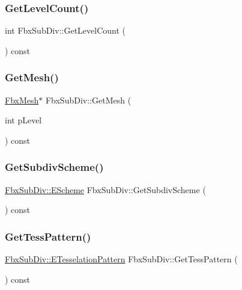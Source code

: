 \subsubsection{\texorpdfstring{Get\+Level\+Count()}{GetLevelCount()}}
{\footnotesize\ttfamily int Fbx\+Sub\+Div\+::\+Get\+Level\+Count (\begin{DoxyParamCaption}{ }\end{DoxyParamCaption}) const}

\mbox{\label{class_fbx_sub_div_a705af0c50cdd202b19bdce9c36d90f01}} 
\subsubsection{\texorpdfstring{Get\+Mesh()}{GetMesh()}}
{\footnotesize\ttfamily \hyperlink{class_fbx_mesh}{Fbx\+Mesh}$\ast$ Fbx\+Sub\+Div\+::\+Get\+Mesh (\begin{DoxyParamCaption}\item[{int}]{p\+Level }\end{DoxyParamCaption}) const}

\mbox{\label{class_fbx_sub_div_a9a0ebbb75fa4597b04a09058a4e5db0b}} 
\subsubsection{\texorpdfstring{Get\+Subdiv\+Scheme()}{GetSubdivScheme()}}
{\footnotesize\ttfamily \hyperlink{class_fbx_sub_div_aecdd4fdebb20f2796363989eba8ee9f5}{Fbx\+Sub\+Div\+::\+E\+Scheme} Fbx\+Sub\+Div\+::\+Get\+Subdiv\+Scheme (\begin{DoxyParamCaption}{ }\end{DoxyParamCaption}) const}

\mbox{\label{class_fbx_sub_div_aef8fee5ac4e87bdc77606b70b61a279f}} 
\subsubsection{\texorpdfstring{Get\+Tess\+Pattern()}{GetTessPattern()}}
{\footnotesize\ttfamily \hyperlink{class_fbx_sub_div_a06cb3da0d9b384dc83585caa49f46684}{Fbx\+Sub\+Div\+::\+E\+Tesselation\+Pattern} Fbx\+Sub\+Div\+::\+Get\+Tess\+Pattern (\begin{DoxyParamCaption}{ }\end{DoxyParamCaption}) const}

